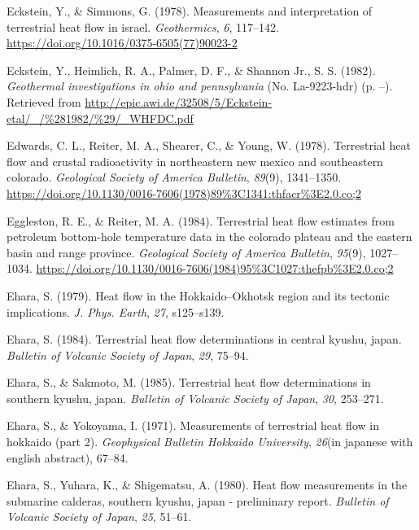 \begin{CSLReferences}{1}{1}
\leavevmode{}%
Eckstein, Y., \& Simmons, G. (1978). Measurements and interpretation of terrestrial heat flow in israel. \emph{Geothermics}, \emph{6}, 117--142. \url{https://doi.org/10.1016/0375-6505(77)90023-2}

\leavevmode{}%
Eckstein, Y., Heimlich, R. A., Palmer, D. F., \& Shannon Jr., S. S. (1982). \emph{Geothermal investigations in ohio and pennsylvania} (No. La-9223-hdr) (p. --). Retrieved from \url{http://epic.awi.de/32508/5/Eckstein-etal/_/\%281982/\%29/_WHFDC.pdf}

\leavevmode{}%
Edwards, C. L., Reiter, M. A., Shearer, C., \& Young, W. (1978). Terrestrial heat flow and crustal radioactivity in northeastern new mexico and southeastern colorado. \emph{Geological Society of America Bulletin}, \emph{89}(9), 1341--1350. \url{https://doi.org/10.1130/0016-7606(1978)89\%3C1341:thfacr\%3E2.0.co;2}

\leavevmode{}%
Eggleston, R. E., \& Reiter, M. A. (1984). Terrestrial heat flow estimates from petroleum bottom-hole temperature data in the colorado plateau and the eastern basin and range province. \emph{Geological Society of America Bulletin}, \emph{95}(9), 1027--1034. \url{https://doi.org/10.1130/0016-7606(1984)95\%3C1027:thefpb\%3E2.0.co;2}

\leavevmode{}%
Ehara, S. (1979). Heat flow in the {Hokkaido--Okhotsk} region and its tectonic implications. \emph{J. Phys. Earth}, \emph{27}, s125--s139.

\leavevmode{}%
Ehara, S. (1984). Terrestrial heat flow determinations in central kyushu, japan. \emph{Bulletin of Volcanic Society of Japan}, \emph{29}, 75--94.

\leavevmode{}%
Ehara, S., \& Sakmoto, M. (1985). Terrestrial heat flow determinations in southern kyushu, japan. \emph{Bulletin of Volcanic Society of Japan}, \emph{30}, 253--271.

\leavevmode{}%
Ehara, S., \& Yokoyama, I. (1971). Measurements of terrestrial heat flow in hokkaido (part 2). \emph{Geophysical Bulletin Hokkaido University}, \emph{26}(in japanese with english abstract), 67--84.

\leavevmode{}%
Ehara, S., Yuhara, K., \& Shigematsu, A. (1980). Heat flow measurements in the submarine calderas, southern kyushu, japan - preliminary report. \emph{Bulletin of Volcanic Society of Japan}, \emph{25}, 51--61.


\end{CSLReferences}
